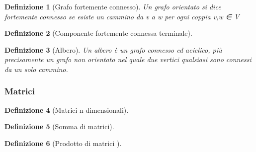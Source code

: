 \documentclass[a4paper]{article}
\newtheorem*{definition}{Definizione}
\begin{document}
\begin{definition}[Grafo fortemente connesso]Un grafo orientato si dice fortemente connesso se esiste un cammino da v a w per ogni coppia v,w ∈ V
\end{definition}

\begin{definition}[Componente fortemente connessa terminale]
\end{definition}

\begin{definition}[Albero]Un albero è un grafo connesso ed aciclico, più precisamente un grafo non orientato nel quale due vertici qualsiasi sono connessi da un solo cammino.


\end{definition}

\subsubsection{Matrici}

\begin{definition}[Matrici n-dimensionali]
\end{definition}

\begin{definition}[Somma di matrici]
\end{definition}

\begin{definition}[Prodotto di matrici
\end{definition}

\begin{definition}[Vettore per matrice]
\end{definition}
\end{document}
